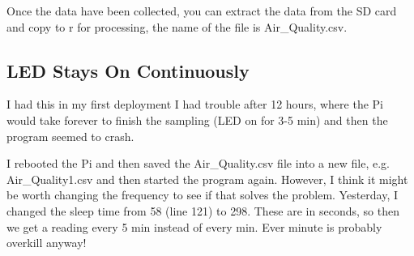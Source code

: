 \documentclass{article}\usepackage[]{graphicx}\usepackage[]{color}
\begin{document}
Once the data have been collected, you can extract the data from the SD card and copy to r for processing, the name of the file is Air\_Quality.csv.

\subsection{LED Stays On Continuously}

I had this in my first deployment I had trouble after 12 hours, where the Pi would take forever to finish the sampling (LED on for 3-5 min) and then the program seemed to crash. 

I rebooted the Pi and then saved the Air\_Quality.csv file into a new file, e.g. Air\_Quality1.csv and then started the program again. However, I think it might be worth changing the frequency to see if that solves the problem. Yesterday, I changed the sleep time from 58 (line 121) to 298. These are in seconds, so then we get a reading every 5 min instead of every min. Ever minute is probably overkill anyway!
\end{document}
